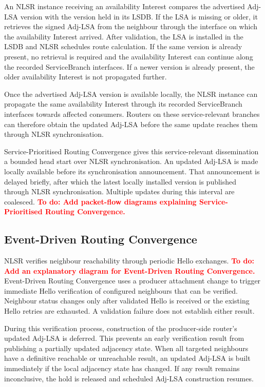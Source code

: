 \documentclass[10pt,conference]{IEEEtran}
\newcommand{\todo}[1]{\textbf{\textcolor{red}{To do: #1}}}
\begin{document}
An NLSR instance receiving an availability Interest compares the advertised Adj-LSA version with the version held in its LSDB. If the LSA is missing or older, it retrieves the signed Adj-LSA from the neighbour through the interface on which the availability Interest arrived. After validation, the LSA is installed in the LSDB and NLSR schedules route calculation. If the same version is already present, no retrieval is required and the availability Interest can continue along the recorded ServiceBranch interfaces. If a newer version is already present, the older availability Interest is not propagated further.

Once the advertised Adj-LSA version is available locally, the NLSR instance can propagate the same availability Interest through its recorded ServiceBranch interfaces towards affected consumers. Routers on these service-relevant branches can therefore obtain the updated Adj-LSA before the same update reaches them through NLSR synchronisation.

Service-Prioritised Routing Convergence gives this service-relevant dissemination a bounded head start over NLSR synchronisation. An updated Adj-LSA is made locally available before its synchronisation announcement. That announcement is delayed briefly, after which the latest locally installed version is published through NLSR synchronisation. Multiple updates during this interval are coalesced. \todo{Add packet-flow diagrams explaining Service-Prioritised Routing Convergence.}

\subsection{Event-Driven Routing Convergence}
\label{sec:design:edrc}

NLSR verifies neighbour reachability through periodic Hello exchanges. \todo{Add an explanatory diagram for Event-Driven Routing Convergence.} Event-Driven Routing Convergence uses a producer attachment change to trigger immediate Hello verification of configured neighbours that can be verified. Neighbour status changes only after validated Hello is received or the existing Hello retries are exhausted. A validation failure does not establish either result.

During this verification process, construction of the producer-side router's updated Adj-LSA is deferred. This prevents an early verification result from publishing a partially updated adjacency state. When all targeted neighbours have a definitive reachable or unreachable result, an updated Adj-LSA is built immediately if the local adjacency state has changed. If any result remains inconclusive, the hold is released and scheduled Adj-LSA construction resumes.
\end{document}
